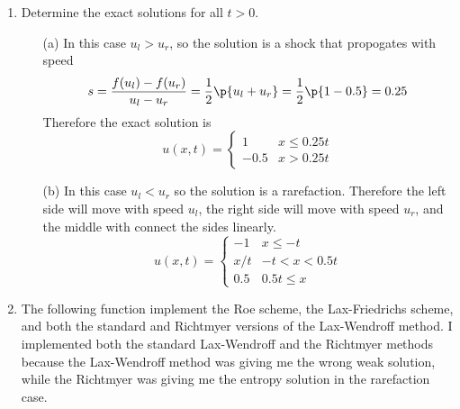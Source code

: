 \documentclass[11pt, oneside]{article}
\begin{document}
\begin{enumerate}
  \item %
    Determine the exact solutions for all $t > 0$.
    \begin{enumerate}
      \item[(a)]
        In this case $u_l > u_r$, so the solution is a shock that propogates
        with speed
        \[
          s = \frac{f(u_l) - f(u_r)}{u_l - u_r} = \frac{1}{2} \p{u_l + u_r} = \frac{1}{2} \p{1 - 0.5} = 0.25
        \]
        Therefore the exact solution is
        \[
          u(x, t) =
          \begin{cases}
            1 & x \le 0.25 t \\
            -0.5 & x > 0.25 t
          \end{cases}
        \]

      \item[(b)]
        In this case $u_l < u_r$ so the solution is a rarefaction.
        Therefore the left side will move with speed $u_l$, the right side
        will move with speed $u_r$, and the middle with connect the sides linearly.
        \[
          u(x, t) =
          \begin{cases}
            -1 & x \le -t \\
            x/t & -t < x < 0.5t \\
            0.5 & 0.5 t \le x
          \end{cases}
        \]
    \end{enumerate}

  \item %
    The following function implement the Roe scheme, the Lax-Friedrichs scheme,
    and both the standard and Richtmyer versions of the Lax-Wendroff method.
    I implemented both the standard Lax-Wendroff and the Richtmyer methods
    because the Lax-Wendroff method was giving me the wrong weak solution, while
    the Richtmyer was giving me the entropy solution in the rarefaction case.
    
    
    
    


\end{enumerate}
\end{document}
